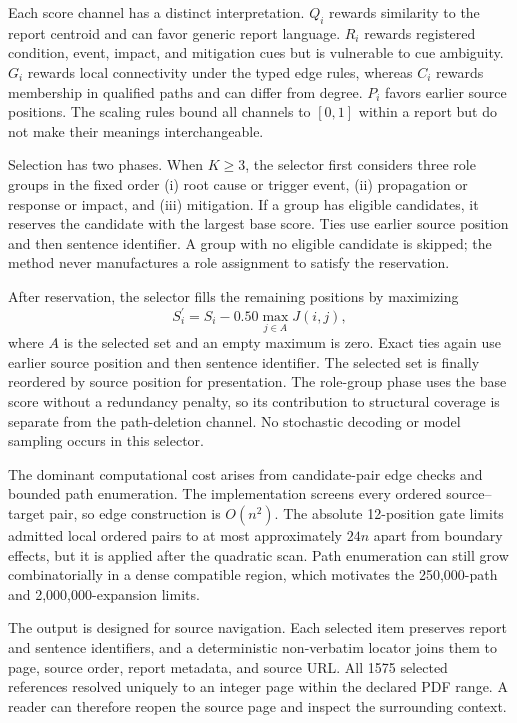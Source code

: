 \documentclass[applsci,article,submit,moreauthors]{Definitions/mdpi}
\begin{document}
Each score channel has a distinct interpretation. $Q_i$ rewards similarity to the report centroid and can favor generic report language. $R_i$ rewards registered condition, event, impact, and mitigation cues but is vulnerable to cue ambiguity. $G_i$ rewards local connectivity under the typed edge rules, whereas $C_i$ rewards membership in qualified paths and can differ from degree. $P_i$ favors earlier source positions. The scaling rules bound all channels to $[0,1]$ within a report but do not make their meanings interchangeable.

Selection has two phases. When $K\geq3$, the selector first considers three role groups in the fixed order (i) root cause or trigger event, (ii) propagation or response or impact, and (iii) mitigation. If a group has eligible candidates, it reserves the candidate with the largest base score. Ties use earlier source position and then sentence identifier. A group with no eligible candidate is skipped; the method never manufactures a role assignment to satisfy the reservation.

After reservation, the selector fills the remaining positions by maximizing
\begin{equation}
S_i^{\prime}=S_i-0.50\max_{j\in A}J(i,j),
\end{equation}
where $A$ is the selected set and an empty maximum is zero. Exact ties again use earlier source position and then sentence identifier. The selected set is finally reordered by source position for presentation. The role-group phase uses the base score without a redundancy penalty, so its contribution to structural coverage is separate from the path-deletion channel. No stochastic decoding or model sampling occurs in this selector.

The dominant computational cost arises from candidate-pair edge checks and bounded path enumeration. The implementation screens every ordered source--target pair, so edge construction is $O(n^2)$. The absolute 12-position gate limits admitted local ordered pairs to at most approximately $24n$ apart from boundary effects, but it is applied after the quadratic scan. Path enumeration can still grow combinatorially in a dense compatible region, which motivates the 250,000-path and 2,000,000-expansion limits.

The output is designed for source navigation. Each selected item preserves report and sentence identifiers, and a deterministic non-verbatim locator joins them to page, source order, report metadata, and source URL. All 1575 selected references resolved uniquely to an integer page within the declared PDF range. A reader can therefore reopen the source page and inspect the surrounding context.
\end{document}
